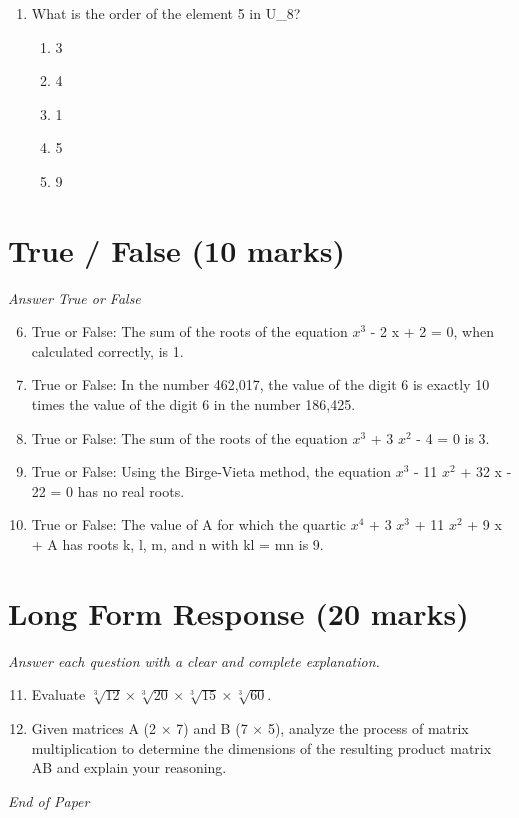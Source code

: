 \documentclass[12pt]{article}
\begin{document}
\begin{enumerate}[label=\arabic*.]
\begin{enumerate}[label=(\alph*)]
    \item 0.6931471
    \item 3.7320508
    \item 2.3025851
    \item 6.2831853
    \item 1.4142135
\end{enumerate}
\item What is the order of the element 5 in U\_8?
\begin{enumerate}[label=(\alph*)]
    \item 3
    \item 4
    \item 1
    \item 5
    \item 9
\end{enumerate}
\end{enumerate}

\section*{True / False (10 marks)}
\textit{Answer True or False}
\begin{enumerate}[label=\arabic*.]
\setcounter{enumi}{5}
\item True or False: The sum of the roots of the equation $x^3$ - 2 x + 2 = 0, when calculated correctly, is 1.
\item True or False: In the number 462,017, the value of the digit 6 is exactly 10 times the value of the digit 6 in the number 186,425.
\item True or False: The sum of the roots of the equation $x^3$ + 3 $x^2$ - 4 = 0 is 3.
\item True or False: Using the Birge-Vieta method, the equation $x^3$ - 11 $x^2$ + 32 x - 22 = 0 has no real roots.
\item True or False: The value of A for which the quartic $x^4$ + 3 $x^3$ + 11 $x^2$ + 9 x + A has roots k, l, m, and n with kl = mn is 9.
\end{enumerate}

\section*{Long Form Response (20 marks)}
\textit{Answer each question with a clear and complete explanation.}
\begin{enumerate}[label=\arabic*.]
\setcounter{enumi}{10}
\item Evaluate $\sqrt[3]{12}\times \sqrt[3]{20}\times \sqrt[3]{15}\times \sqrt[3]{60}$.
\item Given matrices A (2 \ensuremath{\times} 7) and B (7 \ensuremath{\times} 5), analyze the process of matrix multiplication to determine the dimensions of the resulting product matrix AB and explain your reasoning.
\end{enumerate}

\vfill
\noindent\textit{End of Paper}
\end{document}
